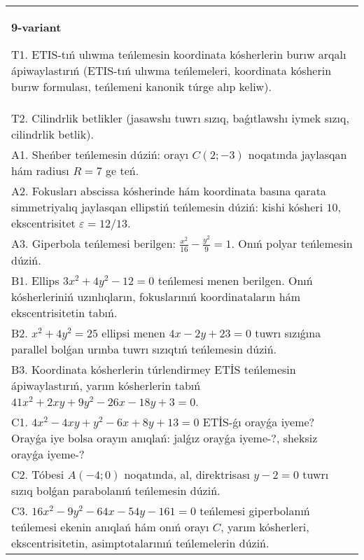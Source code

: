 \documentclass{article}
\begin{document}
\begin{tabular}{m{17cm}}
\textbf{9-variant}
\newline

T1. ETIS-tıń ulıwma teńlemesin koordinata kósherlerin burıw arqalı ápiwaylastırıń (ETIS-tıń ulıwma teńlemeleri, koordinata kósherin burıw formulası, teńlemeni kanonik túrge alıp keliw).\\

T2. Cilindrlik betlikler (jasawshı tuwrı sızıq, baǵıtlawshı iymek sızıq, cilindrlik betlik).\\

A1. Sheńber teńlemesin dúziń: orayı $C (2;-3) $ noqatında jaylasqan hám radiusı $R=7$ ge teń.\\

A2. Fokusları abscissa kósherinde hám koordinata basına qarata simmetriyalıq jaylasqan ellipstiń teńlemesin dúziń: kishi kósheri $10$, ekscentrisitet $\varepsilon=12/13$.\\

A3. Giperbola teńlemesi berilgen: $\frac{x^{2}}{16}-\frac{y^{2}}{9}=1$. Onıń polyar teńlemesin dúziń.\\

B1. Ellips $3x^{2} + 4y^{2} - 12 = 0$ teńlemesi menen berilgen. Onıń kósherleriniń uzınlıqların, fokuslarınıń koordinataların hám ekscentrisitetin tabıń.  \\

B2. $x^{2} + 4y^{2} = 25$ ellipsi menen $4x - 2y + 23 = 0$ tuwrı sızıǵına parallel bolǵan urınba tuwrı sızıqtıń teńlemesin dúziń.  \\

B3. Koordinata kósherlerin túrlendirmey ETİS teńlemesin ápiwaylastırıń, yarım kósherlerin tabıń $41x^{2} + 2xy + 9y^{2} - 26x - 18y + 3 = 0$.  \\

C1. $4x^{2} - 4xy + y^{2} - 6x + 8y + 13 = 0$ ETİS-ǵı orayǵa iyeme? Orayǵa iye bolsa orayın anıqlań: jalǵız orayǵa iyeme-?, sheksiz orayǵa iyeme-?  \\

C2. Tóbesi $A(-4;0)$ noqatında, al, direktrisası $y - 2 = 0$ tuwrı sızıq bolǵan parabolanıń teńlemesin dúziń.\\

C3. $16x^{2} - 9y^{2} - 64x - 54y - 161 = 0$ teńlemesi giperbolanıń teńlemesi ekenin anıqlań hám onıń orayı $C$, yarım kósherleri, ekscentrisitetin, asimptotalarınıń teńlemelerin dúziń.  \\

\end{tabular}
\vspace{1cm}
\end{document}
